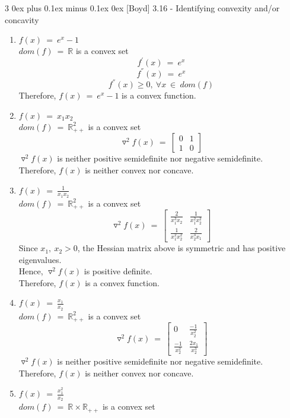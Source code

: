 \documentclass[12pt, draftcls, onecolumn]{IEEEtran}
\makeatletter
\def\subsubsection{\@startsection{subsubsection}%
                                 {3}%
                                 {\z@}%
                                 {0ex plus 0.1ex minus 0.1ex}%
                                 {0ex}%
                                 {\normalfont\normalsize\bfseries}}%
\makeatother
\begin{document}
\subsubsection{[Boyd] 3.16 - Identifying convexity and/or concavity}
\begin{enumerate}
    \item $f(x)\ =\ e^x - 1$
    \\$dom(f)\ =\ \mathbb{R}$ is a convex set
    \[f^{'}(x)\ =\ e^x\]
    \[f^{''}(x)\ =\ e^x\]
    \[f^{''}(x) \geq 0,\ \forall x\ \in\ dom(f)\]
    Therefore, $f(x)\ =\ e^x - 1$ is a convex function.
    \item $f(x)\ =\ x_1 x_2$
    \\$dom(f)\ =\ \mathbb{R}^2_{++}$ is a convex set
    \[\triangledown^2 f(x)\ =\ \begin{bmatrix}
    0 & 1\\
    1 & 0
    \end{bmatrix}\]
    $\triangledown^2 f(x)$ is neither positive semidefinite nor negative semidefinite.
    \\Therefore, $f(x)$ is neither convex nor concave.
    \item $f(x)\ =\ \frac{1}{x_1 x_2}$
    \\$dom(f)\ =\ \mathbb{R}^2_{++}$ is a convex set
    \[\triangledown^2 f(x)\ =\ \begin{bmatrix}
    \frac{2}{x_1^3 x_2} & \frac{1}{x_1^2 x_2^2}\\
    \frac{1}{x_1^2 x_2^2} & \frac{2}{x_2^3 x_1}
    \end{bmatrix}\]
    Since $x_1,\ x_2 > 0$, the Hessian matrix above is symmetric and has positive eigenvalues.
    \\Hence, $\triangledown^2 f(x)$ is positive definite.
    \\Therefore, $f(x)$ is a convex function.
    \item $f(x)\ =\ \frac{x_1}{x_2}$
    \\$dom(f)\ =\ \mathbb{R}^2_{++}$ is a convex set
    \[\triangledown^2 f(x)\ =\ \begin{bmatrix}
    0 & \frac{-1}{x_2^2}\\
    \frac{-1}{x_2^2} & \frac{2x_1}{x_2^3}
    \end{bmatrix}\]
    $\triangledown^2 f(x)$ is neither positive semidefinite nor negative semidefinite.
    \\Therefore, $f(x)$ is neither convex nor concave.
    \item $f(x)\ =\ \frac{x_1^2}{x_2}$
    \\$dom(f)\ =\ \mathbb{R}\times\mathbb{R}_{++}$ is a convex set

\end{enumerate}
\end{document}
